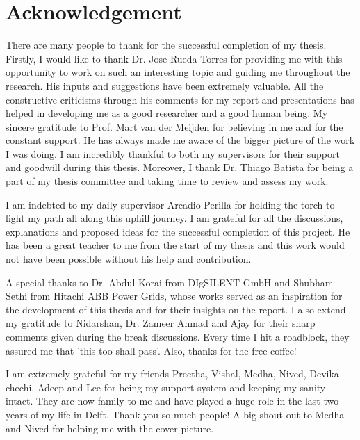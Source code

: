 \chapter*{Acknowledgement}

There are many people to thank for the successful completion of my thesis. Firstly, I would like to thank Dr. Jose Rueda Torres for providing me with this opportunity to work on such an interesting topic and guiding me throughout the research. His inputs and suggestions have been extremely valuable. All the constructive criticisms through his comments for my report and presentations has helped in developing me as a good researcher and a good human being. My sincere gratitude to Prof. Mart van der Meijden for believing in me and for the constant support. He has always made me aware of the bigger picture of the work I was doing. I am incredibly thankful to both my supervisors for their support and goodwill during this thesis. Moreover, I thank Dr. Thiago Batista for being a part of my thesis committee and taking time to review and assess my work.  

I am indebted to my daily supervisor Arcadio Perilla for holding the torch to light my path all along this uphill journey. %
I am grateful for all the discussions, explanations and proposed ideas for the successful completion of this project. He has been a great teacher to me from the start of my thesis and this work would not have been possible without his help and contribution. 


A special thanks to Dr. Abdul Korai from DIgSILENT GmbH and Shubham Sethi from Hitachi ABB Power Grids, whose works served as an inspiration for the development of this thesis and for their insights on the report. I also extend my gratitude to Nidarshan, Dr. Zameer Ahmad and Ajay for their sharp comments given during the break discussions. Every time I hit a roadblock, they assured me that 'this too shall pass'. Also, thanks for the free coffee! 

I am extremely grateful for my friends Preetha, Vishal, Medha, Nived, Devika chechi, Adeep and Lee for being my support system and keeping my sanity intact. They are now family to me and have played a huge role in the last two years of my life in Delft. Thank you so much people! A big shout out to Medha and Nived for helping me with the cover picture. 

